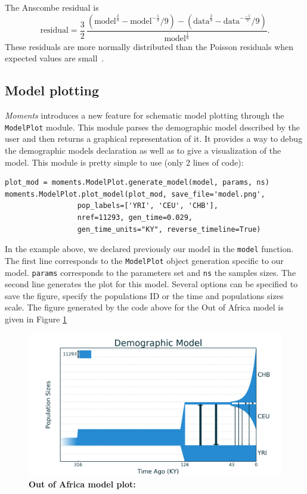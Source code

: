 \documentclass[12pt]{article}
\makeatletter
\newcommand{\py}[1]{\lstinline[language=Python, showstringspaces=False]@#1@}
\makeatother
\begin{document}
The Anscombe residual is
\begin{equation}
\text{residual} = \frac{3}{2} \, \frac{(\text{model}^\frac{2}{3} - \text{model}^{-\frac{1}{3}}/9) - (\text{data}^\frac{2}{3} - \text{data}^{-\frac{-1}{3}}/9)}{\text{model}^\frac{1}{6}}.
\end{equation}
These residuals are more normally distributed than the Poisson residuals when expected values are small~\cite{bib:Pierce1986}.

\subsection{Model plotting}
\textit{Moments} introduces a new feature for schematic model plotting through the \py{ModelPlot} module. This module parses the demographic model described by the user and then returns a graphical representation of it. It provides a way to debug the demographic models declaration as well as to give a visualization of the model.
This module is pretty simple to use (only 2 lines of code):
\begin{lstlisting}
plot_mod = moments.ModelPlot.generate_model(model, params, ns)
moments.ModelPlot.plot_model(plot_mod, save_file='model.png',
			     pop_labels=['YRI', 'CEU', 'CHB'],
		 	     nref=11293, gen_time=0.029,
			     gen_time_units="KY", reverse_timeline=True)
\end{lstlisting}
In the example above, we declared previously our model in the \py{model} function. The first line corresponds to the \py{ModelPlot} object generation specific to our model. \py{params} corresponds to the parameters set and \py{ns} the samples sizes. The second line generates the plot for this model. Several options can be specified to save the figure, specify the populations ID or the time and populations sizes scale.
The figure generated by the code above for the Out of Africa model is given in Figure \ref{fig:model_plot}

\begin{figure}
\centering
\includegraphics[scale=0.5]{model.png}
\caption{\textbf{Out of Africa model plot:}\label{fig:model_plot}}
\end{figure}
\end{document}
